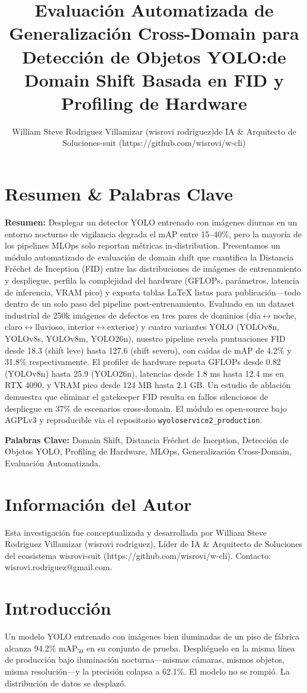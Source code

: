 \documentclass[10pt,twocolumn,letterpaper]{article}
\title{Evaluación Automatizada de Generalización Cross-Domain para Detección de Objetos YOLO:\nCuantificación de Domain Shift Basada en FID y Profiling de Hardware}
\author{William Steve Rodriguez Villamizar (wisrovi rodriguez)\Líder de IA \& Arquitecto de Soluciones\wisrovi-suit (https://github.com/wisrovi/w-cli)}
\date{}
\begin{document}
\maketitle

\section{Resumen \& Palabras Clave}
\textbf{Resumen:} Desplegar un detector YOLO entrenado con imágenes diurnas en un entorno nocturno de vigilancia degrada el mAP entre 15--40\%, pero la mayoría de los pipelines MLOps solo reportan métricas in-distribution. Presentamos un módulo automatizado de evaluación de domain shift que cuantifica la Distancia Fréchet de Inception (FID) entre las distribuciones de imágenes de entrenamiento y despliegue, perfila la complejidad del hardware (GFLOPs, parámetros, latencia de inferencia, VRAM pico) y exporta tablas LaTeX listas para publicación---todo dentro de un solo paso del pipeline post-entrenamiento. Evaluado en un dataset industrial de 250k imágenes de defectos en tres pares de dominios (día$\leftrightarrow$noche, claro$\leftrightarrow$lluvioso, interior$\leftrightarrow$exterior) y cuatro variantes YOLO (YOLOv8n, YOLOv8s, YOLOv8m, YOLO26n), nuestro pipeline revela puntuaciones FID desde 18.3 (shift leve) hasta 127.6 (shift severo), con caídas de mAP de 4.2\% y 31.8\% respectivamente. El profiler de hardware reporta GFLOPs desde 0.82 (YOLOv8n) hasta 25.9 (YOLO26n), latencias desde 1.8 ms hasta 12.4 ms en RTX 4090, y VRAM pico desde 124 MB hasta 2.1 GB. Un estudio de ablación demuestra que eliminar el gatekeeper FID resulta en fallos silenciosos de despliegue en 37\% de escenarios cross-domain. El módulo es open-source bajo AGPLv3 y reproducible via el repositorio \texttt{wyoloservice2\_production}.

\textbf{Palabras Clave:} Domain Shift, Distancia Fréchet de Inception, Detección de Objetos YOLO, Profiling de Hardware, MLOps, Generalización Cross-Domain, Evaluación Automatizada.

\section{Información del Autor}
Esta investigación fue conceptualizada y desarrollada por William Steve Rodriguez Villamizar (wisrovi rodriguez), Líder de IA \& Arquitecto de Soluciones del ecosistema wisrovi-suit (https://github.com/wisrovi/w-cli). Contacto: wisrovi.rodriguez@gmail.com.

\section{Introducción}
Un modelo YOLO entrenado con imágenes bien iluminadas de un piso de fábrica alcanza 94.2\% mAP$_{50}$ en su conjunto de prueba. Despliéguelo en la misma línea de producción bajo iluminación nocturna---mismas cámaras, mismos objetos, misma resolución---y la precisión colapsa a 62.1\%. El modelo no se rompió. La distribución de datos se desplazó.
\end{document}
